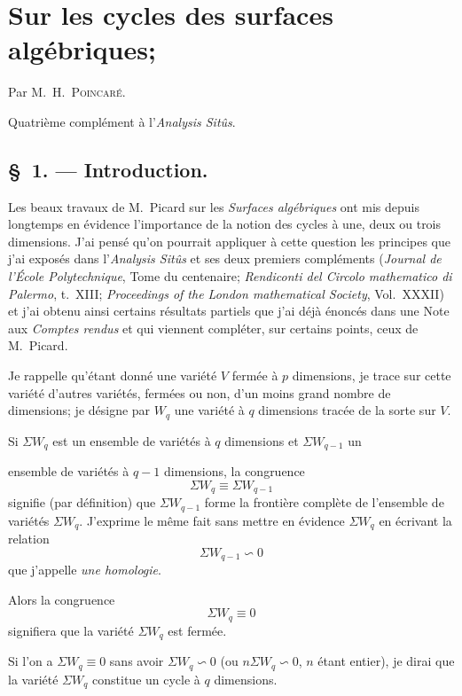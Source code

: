 \documentclass{article}
\begin{document}

\section*{Sur les cycles des surfaces algébriques;}

Par M.~H.~\textsc{Poincaré}.

Quatrième complément à l'\emph{Analysis Sitûs}.

\subsection*{\S~1. --- Introduction.}

Les beaux travaux de M.~Picard sur les \emph{Surfaces algébriques} ont mis depuis longtemps en évidence l'importance de la notion des cycles à une, deux ou trois dimensions. J'ai pensé qu'on pourrait appliquer à cette question les principes que j'ai exposés dans l'\emph{Analysis Sitûs} et ses deux premiers compléments (\emph{Journal de l'École Polytechnique}, Tome du centenaire; \emph{Rendiconti del Circolo mathematico di Palermo}, t.\ XIII; \emph{Proceedings of the London mathematical Society}, Vol.\ XXXII) et j'ai obtenu ainsi certains résultats partiels que j'ai déjà énoncés dans une Note aux \emph{Comptes rendus} et qui viennent compléter, sur certains points, ceux de M.~Picard.

Je rappelle qu'étant donné une variété $V$ fermée à $p$ dimensions, je trace sur cette variété d'autres variétés, fermées ou non, d'un moins grand nombre de dimensions; je désigne par $W_{q}$ une variété à $q$ dimensions tracée de la sorte sur $V$.

Si $\Sigma W_{q}$ est un ensemble de variétés à $q$ dimensions et $\Sigma W_{q-1}$ un

ensemble de variétés à $q - 1$ dimensions, la congruence
\[ \Sigma W_{q} \equiv \Sigma W_{q-1} \]
signifie (par définition) que $\Sigma W_{q-1}$ forme la frontière complète de l'ensemble de variétés $\Sigma W_{q}$. J'exprime le même fait sans mettre en évidence $\Sigma W_{q}$ en écrivant la relation
\[ \Sigma W_{q-1} \backsim 0 \]
que j'appelle \emph{une homologie}.

Alors la congruence
\[ \Sigma W_{q} \equiv 0 \]
signifiera que la variété $\Sigma W_{q}$ est fermée.

Si l'on a $\Sigma W_{q} \equiv 0$ sans avoir $\Sigma W_{q} \backsim 0$ (ou $n\Sigma W_{q} \backsim 0$, $n$ étant entier), je dirai que la variété $\Sigma W_{q}$ constitue un cycle à $q$ dimensions.
\end{document}
